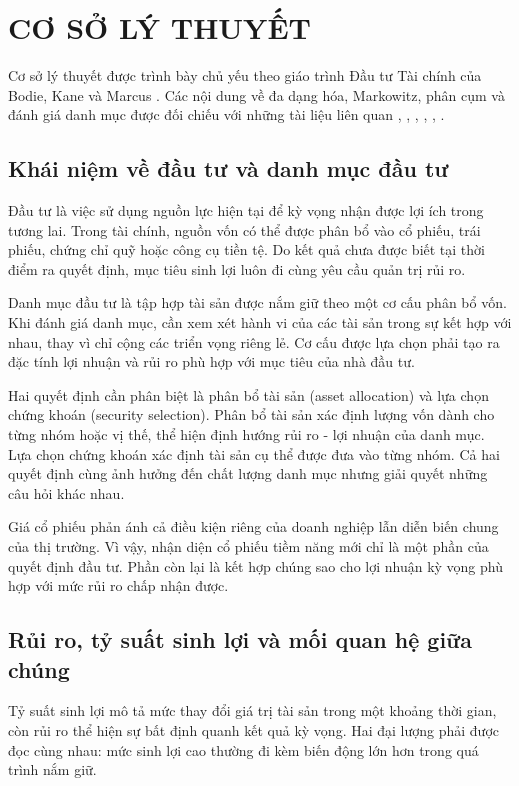 \documentclass[12pt,a4paper,openany,oneside]{book}
\begin{document}
\numberedchapters
\chapter{CƠ SỞ LÝ THUYẾT}\label{Toc227188417}
Cơ sở lý thuyết được trình bày chủ yếu theo giáo trình Đầu tư Tài chính của Bodie, Kane và Marcus \cite{ref05}. Các nội dung về đa dạng hóa, Markowitz, phân cụm và đánh giá danh mục được đối chiếu với những tài liệu liên quan \cite{ref01}, \cite{ref02}, \cite{ref03}, \cite{ref04}, \cite{ref10}, \cite{ref11}.

\section{Khái niệm về đầu tư và danh mục đầu tư}\label{Toc227188418}
Đầu tư là việc sử dụng nguồn lực hiện tại để kỳ vọng nhận được lợi ích trong tương lai. Trong tài chính, nguồn vốn có thể được phân bổ vào cổ phiếu, trái phiếu, chứng chỉ quỹ hoặc công cụ tiền tệ. Do kết quả chưa được biết tại thời điểm ra quyết định, mục tiêu sinh lợi luôn đi cùng yêu cầu quản trị rủi ro.

Danh mục đầu tư là tập hợp tài sản được nắm giữ theo một cơ cấu phân bổ vốn. Khi đánh giá danh mục, cần xem xét hành vi của các tài sản trong sự kết hợp với nhau, thay vì chỉ cộng các triển vọng riêng lẻ. Cơ cấu được lựa chọn phải tạo ra đặc tính lợi nhuận và rủi ro phù hợp với mục tiêu của nhà đầu tư.

Hai quyết định cần phân biệt là phân bổ tài sản (asset allocation) và lựa chọn chứng khoán (security selection). Phân bổ tài sản xác định lượng vốn dành cho từng nhóm hoặc vị thế, thể hiện định hướng rủi ro - lợi nhuận của danh mục. Lựa chọn chứng khoán xác định tài sản cụ thể được đưa vào từng nhóm. Cả hai quyết định cùng ảnh hưởng đến chất lượng danh mục nhưng giải quyết những câu hỏi khác nhau.

Giá cổ phiếu phản ánh cả điều kiện riêng của doanh nghiệp lẫn diễn biến chung của thị trường. Vì vậy, nhận diện cổ phiếu tiềm năng mới chỉ là một phần của quyết định đầu tư. Phần còn lại là kết hợp chúng sao cho lợi nhuận kỳ vọng phù hợp với mức rủi ro chấp nhận được.

\section{Rủi ro, tỷ suất sinh lợi và mối quan hệ giữa chúng}\label{Toc227188419}
Tỷ suất sinh lợi mô tả mức thay đổi giá trị tài sản trong một khoảng thời gian, còn rủi ro thể hiện sự bất định quanh kết quả kỳ vọng. Hai đại lượng phải được đọc cùng nhau: mức sinh lợi cao thường đi kèm biến động lớn hơn trong quá trình nắm giữ.
\end{document}
